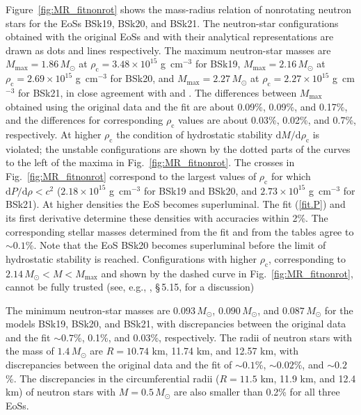 \documentclass{aa}
\newcommand{\gcc}{\mbox{g cm$^{-3}$}}
\newcommand{\dd}{\mathrm{d}}
\newcommand{\rhoc}{\rho_\mathrm{c}}
\begin{document}
Figure~\ref{fig:MR_fitnonrot} shows the mass-radius relation
of nonrotating neutron  stars for the EoSs BSk19, BSk20, and
BSk21. The neutron-star configurations obtained  with the
original EoSs and with their analytical representations are
drawn as dots and lines respectively. The maximum
neutron-star masses are $M_\mathrm{max}=1.86\,M_\odot$ at
$\rhoc=3.48\times10^{15}$ \gcc{} for BSk19,
$M_\mathrm{max}=2.16\,M_\odot$ at $\rhoc=2.69\times10^{15}$
\gcc{} for BSk20,  and $M_\mathrm{max}=2.27\,M_\odot$ at
$\rhoc=2.27\times10^{15}$ \gcc{} for BSk21, in close
agreement with \citet{Chamel-ea11} and \citet{Fantina-ea12}.
The differences between $M_\mathrm{max}$ obtained using the
original data and the fit are about 0.09\%, 0.09\%, and
0.17\%, and the differences for corresponding $\rhoc$ values are about
0.03\%, 0.02\%, and 0.7\%, respectively. At higher $\rhoc$
the condition of hydrostatic stability $\dd M / \dd \rhoc$
is violated; the unstable configurations are shown by the
dotted parts of the curves to the left of the maxima in
Fig.~\ref{fig:MR_fitnonrot}. The crosses in
Fig.~\ref{fig:MR_fitnonrot} correspond to the largest values
of $\rhoc$ for which $\dd P/\dd\rho < c^2$
($2.18\times10^{15}$ \gcc{} for BSk19 and BSk20, and
$2.73\times10^{15}$ \gcc{} for BSk21). At higher densities
the EoS becomes superluminal. The fit (\ref{fit.P}) and its
first derivative determine these densities with accuracies
within 2\%. The corresponding stellar masses determined from
the fit and from the tables agree to $\sim0.1$\%.  Note that
the EoS BSk20 becomes superluminal before the limit of
hydrostatic stability is reached. Configurations with higher
$\rhoc$, corresponding to $2.14\,M_\odot<M<M_\mathrm{max}$
and shown by the dashed curve in
Fig.~\ref{fig:MR_fitnonrot}, cannot be fully trusted (see,
e.g.,  \citealp{HPY}, \S\,5.15, for a discussion)

The minimum neutron-star masses are $0.093\,M_\odot$,
$0.090\,M_\odot$, and $0.087\,M_\odot$ for the models BSk19,
BSk20, and BSk21, with discrepancies between the original
data and the fit $\sim0.7$\%, 0.1\%, and 0.03\%,
respectively. The radii of neutron stars with the mass of
$1.4\,M_\odot$ are $R=10.74$ km, 11.74 km, and 12.57 km,
with discrepancies between the original data and the fit of
$\sim0.1$\%, $\sim0.02$\%, and $\sim0.2$\%.
The discrepancies in the  circumferential radii ($R=11.5$
km, 11.9 km, and 12.4 km) of neutron stars with
$M=0.5\,M_\odot$ are also smaller than 0.2\% for all three EoSs.
\end{document}

